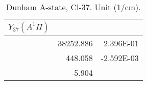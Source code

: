 \begin{table}[h]
\begin{tabular}{crr}
\toprule
$Y_{37} (A^1\Pi)$\\ \midrule 
& 38252.886 & 2.396E-01 \\
& 448.058 & -2.592E-03 \\
& -5.904 \\
\bottomrule
\end{tabular}\caption{Dunham A-state, Cl-37. Unit (1/cm).}\end{table}
